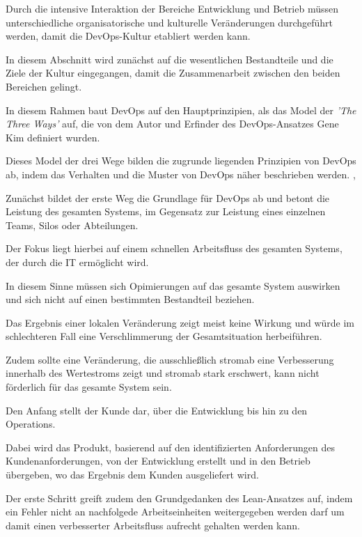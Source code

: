 Durch die intensive Interaktion der Bereiche Entwicklung und Betrieb müssen unterschiedliche organisatorische und kulturelle Veränderungen durchgeführt werden, damit die DevOps-Kultur etabliert werden kann. 

In diesem Abschnitt wird zunächst auf die wesentlichen Bestandteile und die Ziele der Kultur eingegangen, damit die Zusammenarbeit zwischen den beiden Bereichen gelingt.

In diesem Rahmen baut DevOps auf den Hauptprinzipien, als das Model der \textit{'The Three Ways'} auf, die von dem Autor und Erfinder des DevOps-Ansatzes Gene Kim \cite{kim_devops-handbuch_2017} definiert wurden. 

Dieses Model der drei Wege bilden die zugrunde liegenden Prinzipien von DevOps ab, indem das Verhalten und die Muster von DevOps näher beschrieben werden. \cite[S. 9 - 44]{kim_devops-handbuch_2017}, \cite{kim_three_2012}  

Zunächst bildet der erste Weg die Grundlage für DevOps ab und betont die Leistung des gesamten Systems, im Gegensatz zur Leistung eines einzelnen Teams, Silos oder Abteilungen. 

Der Fokus liegt hierbei auf einem schnellen Arbeitsfluss des gesamten Systems, der durch die IT ermöglicht wird. 

In diesem Sinne müssen sich Opimierungen auf das gesamte System auswirken und sich nicht auf einen bestimmten Bestandteil beziehen. 

Das Ergebnis einer lokalen Veränderung zeigt meist keine Wirkung und würde im schlechteren Fall eine Verschlimmerung der Gesamtsituation herbeiführen. \cite[S. 252]{tiemeyer_handbuch_2021} 

Zudem sollte eine Veränderung, die ausschließlich stromab eine Verbesserung innerhalb des Wertestroms zeigt und stromab stark erschwert, kann nicht förderlich für das gesamte System sein. \cite[S. 252]{tiemeyer_handbuch_2021}

Den Anfang stellt der Kunde dar, über die Entwicklung bis hin zu den Operations.

Dabei wird das Produkt, basierend auf den identifizierten Anforderungen des Kundenanforderungen, von der Entwicklung erstellt und in den Betrieb übergeben, wo das Ergebnis dem Kunden ausgeliefert wird.\cite[S. 12]{halstenberg_devops_2020} 

Der erste Schritt greift zudem den Grundgedanken des Lean-Ansatzes auf, indem ein Fehler nicht an nachfolgede Arbeitseinheiten weitergegeben werden darf um damit einen verbesserter Arbeitsfluss aufrecht gehalten werden kann. \cite[S. 252]{tiemeyer_handbuch_2021}  

